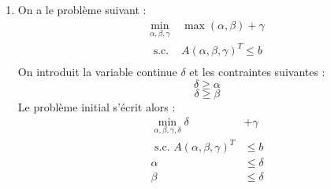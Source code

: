 \documentclass[a4paper,12pt]{article}
\begin{document}
\begin {enumerate}
{    \underline{Autre méthode} \\
    On introduit les variables binaires $y_\alpha$ et $y_\beta$, et la variable continue $y$.
    Le problème s'écrit alors :
    \begin{equation}
        \begin{aligned}
            \min _{\alpha, \beta, y_\alpha, y_\beta, y} & y \\
            \text{ s.c. } 
            &y \leq &\alpha \\
            &y \leq &\beta \\
            &y \geq &\alpha - 2M y_\alpha \\
            &y \geq &\beta - 2M y_\beta \\
            &y_\alpha + y_\beta &= 1 \\
        \end{aligned}
    \end{equation}
    La contrainte $y_\alpha + y_\beta = 1$ assure que l'un des $y_\alpha$ ou $y_\beta$ vaut zéro,
     c'est-à-dire que l'on a bien $y$ qui prend la valeur $\alpha$ ou $\beta$.
    De plus, puisque c'est un problème de minimisation, on a bien $y = min(\alpha, \beta)$. \\
    \textit{N.B. : Nous avons trouvé cette élégante méthode à \underline{\href{https://doi.org/10.3390/math10020283L}{ce lien}}.}
}
\\
\item {
    On a le problème suivant : 
    \begin{equation}
        \begin{aligned}
            \min _{\alpha, \beta, \gamma} & \max (\alpha, \beta) + \gamma \\
            \text{ s.c. } & A(\alpha, \beta, \gamma)^T \leq b \\
        \end{aligned}
    \end{equation}
    On introduit la variable continue $\delta$ et les contraintes suivantes :
    $$ \delta \geq \alpha $$
    $$ \delta \geq \beta $$
    Le problème initial s'écrit alors :
    \begin{equation}
        \begin{aligned}
            \min _{\alpha, \beta, \gamma, \delta}  \delta &+ \gamma \\
            \text{ s.c. }  A(\alpha, \beta, \gamma)^T &\leq b \\
            \alpha &\leq \delta \\
            \beta &\leq \delta \\
        \end{aligned}
    \end{equation}
}


\end{enumerate}
\end{document}
